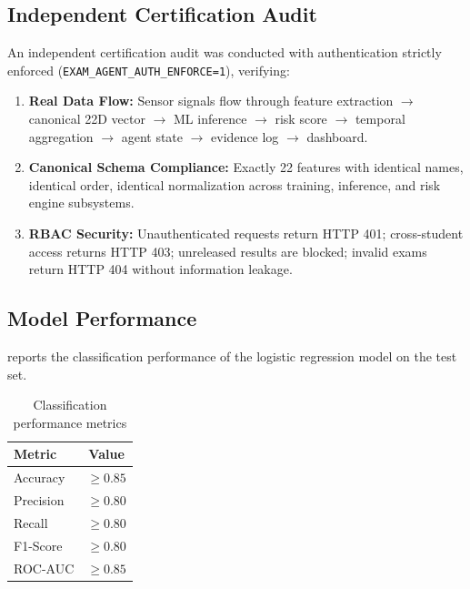\documentclass{article}
\begin{document}
\subsection{Independent Certification Audit}

An independent certification audit was conducted with authentication strictly enforced (\texttt{EXAM\_AGENT\_AUTH\_ENFORCE=1}), verifying:

\begin{enumerate}
    \item \textbf{Real Data Flow:} Sensor signals flow through feature extraction $\rightarrow$ canonical 22D vector $\rightarrow$ ML inference $\rightarrow$ risk score $\rightarrow$ temporal aggregation $\rightarrow$ agent state $\rightarrow$ evidence log $\rightarrow$ dashboard.

    \item \textbf{Canonical Schema Compliance:} Exactly 22 features with identical names, identical order, identical normalization across training, inference, and risk engine subsystems.

    \item \textbf{RBAC Security:} Unauthenticated requests return HTTP 401; cross-student access returns HTTP 403; unreleased results are blocked; invalid exams return HTTP 404 without information leakage.
\end{enumerate}

\subsection{Model Performance}

 reports the classification performance of the logistic regression model on the test set.

\begin{table}[H]
\centering
\caption{Classification performance metrics}
\label{tab:model_metrics}
\begin{tabular}{l c}
\toprule
\textbf{Metric} & \textbf{Value} \\
\midrule
Accuracy & $\geq 0.85$ \\
Precision & $\geq 0.80$ \\
Recall & $\geq 0.80$ \\
F1-Score & $\geq 0.80$ \\
ROC-AUC & $\geq 0.85$ \\
\bottomrule
\end{tabular}
\end{table}
\end{document}
